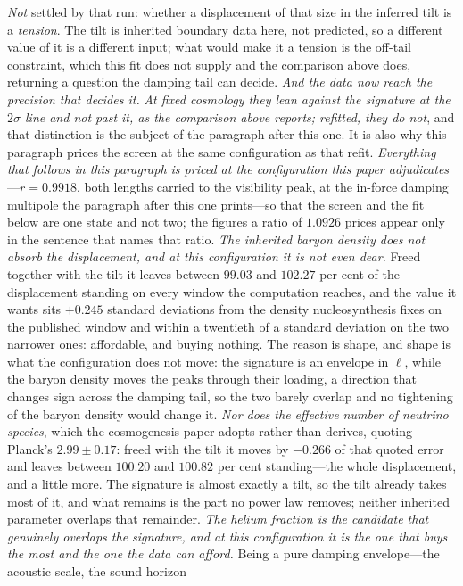 \documentclass[11pt,a4paper]{article}
\theoremstyle{plain}
\theoremstyle{definition}
\theoremstyle{remark}
\begin{document}
\emph{Not} settled by that run: whether a displacement of that size in the inferred tilt is a \emph{tension}. The tilt is inherited boundary data here, not predicted, so a different value of it is a different input; what would make it a tension is the off-tail constraint, which this fit does not supply and the comparison above does, returning a question the damping tail can decide. \emph{And the data now reach the precision that decides it.} \emph{At fixed cosmology they lean against the signature at the $2\sigma$ line and not past it, as the comparison above reports; refitted, they do not}, and that distinction is the subject of the paragraph after this one. It is also why this paragraph prices the screen at the same configuration as that refit. \emph{Everything that follows in this paragraph is priced at the configuration this paper adjudicates}---$r=0.9918$, both lengths carried to the visibility peak, at the in-force damping multipole the paragraph after this one prints---so that the screen and the fit below are one state and not two; the figures a ratio of $1.0926$ prices appear only in the sentence that names that ratio. \emph{The inherited baryon density does not absorb the displacement, and at this configuration it is not even dear.} Freed together with the tilt it leaves between $99.03$ and $102.27$ per cent of the displacement standing on every window the computation reaches, and the value it wants sits $+0.245$ standard deviations from the density nucleosynthesis fixes on the published window and within a twentieth of a standard deviation on the two narrower ones: affordable, and buying nothing. The reason is shape, and shape is what the configuration does not move: the signature is an envelope in $\ell$, while the baryon density moves the peaks through their loading, a direction that changes sign across the damping tail, so the two barely overlap and no tightening of the baryon density would change it. \emph{Nor does the effective number of neutrino species}, which the cosmogenesis paper adopts rather than derives, quoting Planck's $2.99\pm0.17$: freed with the tilt it moves by $-0.266$ of that quoted error and leaves between $100.20$ and $100.82$ per cent standing---the whole displacement, and a little more. The signature is almost exactly a tilt, so the tilt already takes most of it, and what remains is the part no power law removes; neither inherited parameter overlaps that remainder. \emph{The helium fraction is the candidate that genuinely overlaps the signature, and at this configuration it is the one that buys the most and the one the data can afford.} Being a pure damping envelope---the acoustic scale, the sound horizon 
\end{document}

